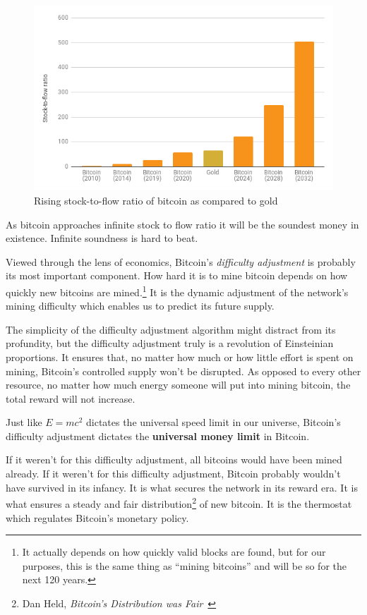 \begin{figure}
  \includegraphics{assets/images/soundness-over-time.png}
  \caption{Rising stock-to-flow ratio of bitcoin as compared to gold}
  \label{fig:soundness-over-time}
\end{figure}

As bitcoin approaches infinite stock to flow ratio it will be the
soundest money in existence. Infinite soundness is hard to beat.

Viewed through the lens of economics, Bitcoin's \textit{difficulty adjustment}
is probably its most important component. How hard it is to mine bitcoin depends
on how quickly new bitcoins are mined.\footnote{It actually depends on how
quickly valid blocks are found, but for our purposes, this is the same thing as
\enquote{mining bitcoins} and will be so for the next 120 years.} It is the dynamic
adjustment of the network's mining difficulty which enables us to predict its
future supply.

The simplicity of the difficulty adjustment algorithm might distract
from its profundity, but the difficulty adjustment truly is a revolution
of Einsteinian proportions. It ensures that, no matter how much or how
little effort is spent on mining, Bitcoin's controlled supply won't be
disrupted. As opposed to every other resource, no matter how much
energy someone will put into mining bitcoin, the total reward will not
increase.

Just like $E=mc^2$ dictates the universal speed limit in our universe,
Bitcoin's difficulty adjustment dictates the \textbf{universal money limit}
in Bitcoin.

If it weren't for this difficulty adjustment, all bitcoins would have been mined
already. If it weren't for this difficulty adjustment, Bitcoin probably wouldn't
have survived in its infancy. It is what secures the network in its reward era.
It is what ensures a steady and fair distribution\footnote{Dan Held,
\textit{Bitcoin's Distribution was Fair}~\cite{distribution-was-fair}} of new
bitcoin. It is the thermostat which regulates Bitcoin's monetary policy.

